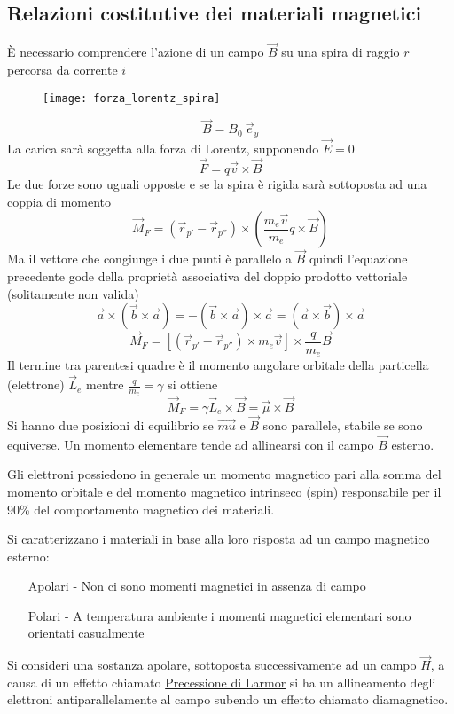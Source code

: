 \subsection{Relazioni costitutive dei materiali magnetici}
È necessario comprendere l'azione di un campo $\vec{B}$ su una spira di raggio $r$ percorsa da corrente $i$
\begin{figure}[H]
\centering
\texttt{[image: forza\_lorentz\_spira]}
\end{figure}
$$
\vec{B} = B_0\ \vec{e}_y
$$
La carica sarà soggetta alla forza di Lorentz, supponendo $\vec{E} = 0$
$$
\vec{F} = q\vec{v}\times\vec{B}
$$
Le due forze sono uguali opposte e se la spira è rigida sarà sottoposta ad una coppia 
di momento
$$
\vec{M}_F = (\vec{r}_{p'}-\vec{r}_{p''}) \times\left(\frac{m_e \vec{v}}{m_e}q\times\vec{B}\right)
$$
Ma il vettore che congiunge i due punti è parallelo a $\vec{B}$ quindi l'equazione 
precedente gode della proprietà associativa del doppio prodotto vettoriale (solitamente non 
valida)
$$
\vec{a}\times(\vec{b}\times\vec{a}) = -(\vec{b}\times\vec{a})\times\vec{a} = (\vec{a}\times
\vec{b})\times\vec{a}
$$
$$
\vec{M}_F = \left[(\vec{r}_{p'}-\vec{r}_{p''})\times m_e\vec{v}\right] \times\frac{q}{m_e}\vec{B}
$$
Il termine tra parentesi quadre è il momento angolare orbitale della particella (elettrone) 
$\vec{L}_e$ mentre $\frac{q}{m_e} = \gamma$ si ottiene
$$
\vec{M}_F = \gamma \vec{L}_e \times\vec{B} = \vec{\mu}\times\vec{B}
$$
Si hanno due posizioni di equilibrio se $\vec{mu}$ e $\vec{B}$ sono parallele, stabile
se sono equiverse. Un momento elementare tende ad allinearsi con il campo $\vec{B}$ esterno.

Gli elettroni possiedono in generale un momento magnetico pari alla somma del momento 
orbitale e del momento magnetico intrinseco (spin) responsabile per il 90\% del 
comportamento magnetico dei materiali.

Si caratterizzano i materiali in base alla loro risposta ad un campo magnetico
esterno:
\begin{itemize}
\item[Apolari] - Non ci sono momenti magnetici in assenza di campo
\item[Polari] - A temperatura ambiente i momenti magnetici elementari sono orientati
casualmente
\end{itemize}

Si consideri una sostanza apolare, sottoposta successivamente ad un campo $\vec{H}$, a 
causa di un effetto chiamato \href{https://it.wikipedia.org/wiki/Precessione_di_Larmor}{Precessione di Larmor} si ha un allineamento degli elettroni antiparallelamente al campo
subendo un effetto chiamato diamagnetico.

